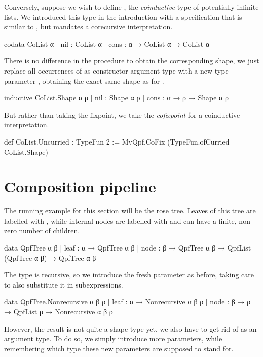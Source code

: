 Conversely, suppose we wish to define , the \emph{coinductive} type of potentially infinite lists.
We introduced this type in the introduction with a specification that is similar to , but mandates a corecursive interpretation.
\begin{leancode}
  codata CoList α
    | nil  : CoList α
    | cons : α → CoList α → CoList α
\end{leancode}
There is no difference in the procedure to obtain the corresponding shape, we just replace all occurrences
of  as constructor argument type with a new type parameter , obtaining the exact same shape
as for .
\begin{leancode}
  inductive CoList.Shape α ρ
    | nil  : Shape α ρ
    | cons : α → ρ → Shape α ρ
\end{leancode}
But rather than taking the fixpoint, we take the \emph{cofixpoint} for a coinductive interpretation.
\begin{leancode}
  def CoList.Uncurried : TypeFun 2 
    := MvQpf.CoFix (TypeFun.ofCurried CoList.Shape)
\end{leancode}





\section{Composition pipeline}%
\label{sec:comp_pipeline}
The running example for this section will be the rose tree. Leaves of this tree are labelled with , while
internal nodes are labelled with  and can have a finite, non-zero number of children.
\begin{leancode}
  data QpfTree α β
    | leaf : α → QpfTree α β
    | node : β → QpfTree α β → QpfList (QpfTree α β) → QpfTree α β
\end{leancode}

The type is recursive, so we introduce the fresh parameter as before, taking care to also substitute it in 
subexpressions.
\begin{leancode}
  data QpfTree.Nonrecursive α β ρ
    | leaf : α → Nonrecursive α β ρ
    | node : β → ρ → QpfList ρ → Nonrecursive α β ρ
\end{leancode}

However, the result is not quite a shape type yet, we also have to get rid of  as an
argument type. To do so, we simply introduce more parameters, while remembering which type these
new parameters are supposed to stand for.

